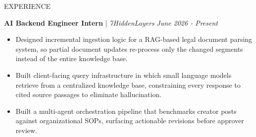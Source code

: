 \documentclass{resume} %
\begin{document}
\vspace{-1em}
\begin{rSection}{EXPERIENCE}

\textbf{AI Backend Engineer Intern} | \textit{7HiddenLayers} \hfill \textit{June 2026 - Present} \\
\vspace{-1.2em}

\begin{itemize}
    \itemsep -3pt
    \item Designed incremental ingestion logic for a RAG-based legal document parsing system, so partial document updates re-process only the changed segments instead of the entire knowledge base.
    \item Built client-facing query infrastructure in which small language models retrieve from a centralized knowledge base, constraining every response to cited source passages to eliminate hallucination.
    \item Built a multi-agent orchestration pipeline that benchmarks creator posts against organizational SOPs, surfacing actionable revisions before approver review.
\end{itemize}

\end{rSection}
\end{document}
